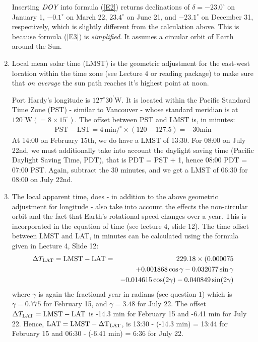 \documentclass[11pt]{article}
\begin{document}
\begin{enumerate}
Inserting $\emph{DOY}$ into formula (\ref{E2}) returns declinations of $\delta = -23.0^{\circ}$ on January 1, $-0.1^{\circ}$ on March 22, $23.4^{\circ}$ on June 21, and $-23.1^{\circ}$ on December 31, respectively, which is slightly different from the calculation above. This is because formula (\ref{E3}) is \emph{simplified}. It assumes a circular orbit of Earth around the Sun.

\item Local mean solar time (LMST) is the geometric adjustment for the east-west location within the time zone (see Lecture 4 or reading package) to make sure that \emph{on average} the sun path reaches it's highest point at noon. 

Port Hardy's longitude is $127^{\circ}30^{\prime}$W. It is located within the Pacific Standard Time Zone (PST) - similar to Vancouver - whose standard meridian is at $120^{\circ}\textrm{W} (=8 \times 15^{\circ})$. The offset between PST and LMST is, in minutes:
\begin{eqnarray*}
\textrm{PST} - \textrm{LST} = 4\,\textrm{min}/^{\circ} \times (120-127.5) = -30  \textrm{min}
\end{eqnarray*}
At 14:00 on February 15th, we do have a LMST of 13:30. For 08:00 on July 22nd, we must additionally take into account the daylight saving time (Pacific Daylight Saving Time, PDT), that is PDT = PST + 1, hence 08:00 PDT = 07:00 PST. Again, subtract the 30 minutes, and we get a LMST of 06:30 for 08:00 on July 22nd.

\item The local apparent time, does - in addition to the above geometric adjustment for longitude - also take into account the effects the non-circular orbit and the fact that Earth's rotational speed changes over a year. This is incorporated in the equation of time (see lecture 4, slide 12). The time offset between LMST and LAT, in minutes can be calculated using the formula given in Lecture 4, Slide 12:
\begin{eqnarray*}
\Delta T_{\rm{LAT}} = \textrm{LMST} - \textrm{LAT}  = && 229.18 \times (0.000075 \\ &&+ 0.001868 \cos \gamma
                - 0.032077 \sin \gamma \\
               &&- 0.014615 \cos(2\gamma) - 0.040849 \sin(2 \gamma) 
\end{eqnarray*}
where $\gamma$ is again the fractional year in radians (see question 1) which is $\gamma = 0.775$ for February 15, and $\gamma = 3.48$ for July 22. The offset $\Delta T_{\rm{LAT}} = \textrm{LMST} - \textrm{LAT}$ is -14.3 min for February 15 and -6.41 min for July 22. Hence, $\rm{LAT} = \rm{LMST} - \Delta T_{\rm{LAT}}$, is 13:30 - (-14.3 min) = 13:44 for February 15 and 06:30 - (-6.41 min) = 6:36 for July 22.


\end{enumerate}
\end{document}
